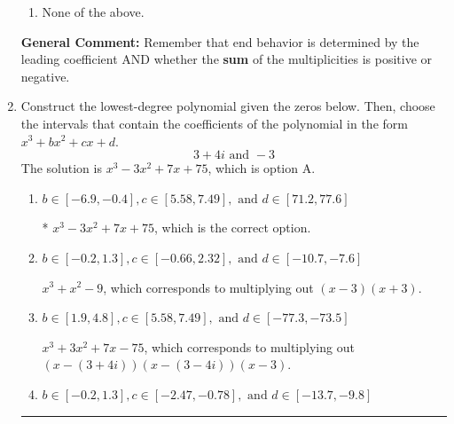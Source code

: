 \documentclass{extbook}[14pt]
\newcommand{\litem}[1]{\item #1

\rule{\textwidth}{0.4pt}}
\begin{document}
\begin{enumerate}
{\begin{enumerate}[label=\Alph*.]
\item None of the above.\end{enumerate}
\textbf{General Comment:} Remember that end behavior is determined by the leading coefficient AND whether the \textbf{sum} of the multiplicities is positive or negative.
}
\litem{
Construct the lowest-degree polynomial given the zeros below. Then, choose the intervals that contain the coefficients of the polynomial in the form $x^3+bx^2+cx+d$.
\[ 3 + 4 i \text{ and } -3 \]
The solution is \( x^{3} -3 x^{2} +7 x + 75 \), which is option A.\begin{enumerate}[label=\Alph*.]
\item \( b \in [-6.9, -0.4], c \in [5.58, 7.49], \text{ and } d \in [71.2, 77.6] \)

* $x^{3} -3 x^{2} +7 x + 75$, which is the correct option.
\item \( b \in [-0.2, 1.3], c \in [-0.66, 2.32], \text{ and } d \in [-10.7, -7.6] \)

$x^{3} + x^{2} -9$, which corresponds to multiplying out $(x -3)(x + 3)$.
\item \( b \in [1.9, 4.8], c \in [5.58, 7.49], \text{ and } d \in [-77.3, -73.5] \)

$x^{3} +3 x^{2} +7 x -75$, which corresponds to multiplying out $(x-(3 + 4 i))(x-(3 - 4 i))(x -3)$.
\item \( b \in [-0.2, 1.3], c \in [-2.47, -0.78], \text{ and } d \in [-13.7, -9.8] \)


\end{enumerate}}
\end{enumerate}
\end{document}

